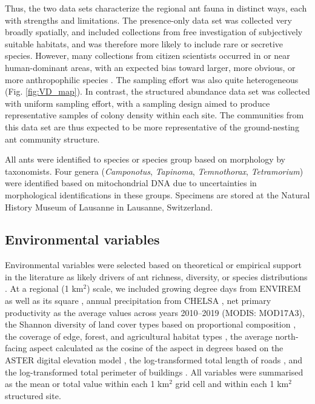 \documentclass[preprint,review,times,12pt,3p]{elsarticle}
\begin{document}
Thus, the two data sets characterize the regional ant fauna in distinct ways, each with strengths and limitations. The presence-only data set was collected very broadly spatially, and included collections from free investigation of subjectively suitable habitats, and was therefore more likely to include rare or secretive species. However, many collections from citizen scientists occurred in or near human-dominant areas, with an expected bias toward larger, more obvious, or more anthropophilic species \citep{Ward2014, Troudet2017}. The sampling effort was also quite heterogeneous (Fig. \ref{fig:VD_map}). In contrast, the structured abundance data set was collected with uniform sampling effort, with a sampling design aimed to produce representative samples of colony density within each site. The communities from this data set are thus expected to be more representative of the ground-nesting ant community structure. 

All ants were identified to species or species group based on morphology by taxonomists. Four genera (\emph{Camponotus}, \emph{Tapinoma}, \emph{Temnothorax}, \emph{Tetramorium}) were identified based on mitochondrial DNA due to uncertainties in morphological identifications in these groups. Specimens are stored at the Natural History Museum of Lausanne in Lausanne, Switzerland. 


\subsection{Environmental variables}
Environmental variables were selected based on theoretical or empirical support in the literature as likely drivers of ant richness, diversity, or species distributions \citep{Bishop2017,Liu2018,Szewczyk2018,Longino2019,Uhey2020}. At a regional (1 km$^2$) scale, we included growing degree days from ENVIREM as well as its square \citep{Title2018}, annual precipitation from CHELSA \citep{Karger2017}, net primary productivity as the average values across years 2010–2019 (MODIS: MOD17A3), the Shannon diversity of land cover types based on proportional composition \citep{Gago-Silva2017}, the coverage of edge, forest, and agricultural habitat types \citep{Gago-Silva2017}, the average north-facing aspect calculated as the cosine of the aspect in degrees based on the ASTER digital elevation model \citep{Tachikawa2011}, the log-transformed total length of roads \citep{OpenStreetMap}, and the log-transformed total perimeter of buildings \citep{OpenStreetMap}. All variables were summarised as the mean or total value within each 1 km$^2$ grid cell and within each 1 km$^2$ structured site.
\end{document}
